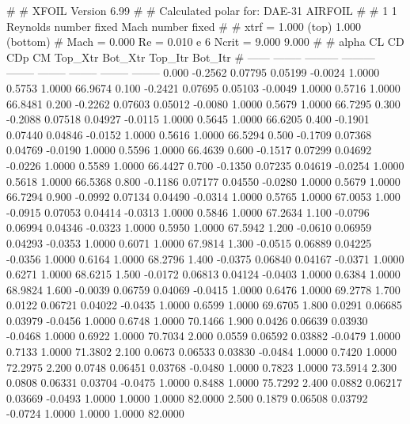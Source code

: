 #  
#       XFOIL         Version 6.99
#  
# Calculated polar for: DAE-31 AIRFOIL                                  
#  
# 1 1 Reynolds number fixed          Mach number fixed         
#  
# xtrf =   1.000 (top)        1.000 (bottom)  
# Mach =   0.000     Re =     0.010 e 6     Ncrit =   9.000  9.000
#  
#   alpha    CL        CD       CDp       CM     Top_Xtr  Bot_Xtr  Top_Itr  Bot_Itr
#  ------ -------- --------- --------- -------- -------- -------- -------- --------
   0.000  -0.2562   0.07795   0.05199  -0.0024   1.0000   0.5753   1.0000  66.9674
   0.100  -0.2421   0.07695   0.05103  -0.0049   1.0000   0.5716   1.0000  66.8481
   0.200  -0.2262   0.07603   0.05012  -0.0080   1.0000   0.5679   1.0000  66.7295
   0.300  -0.2088   0.07518   0.04927  -0.0115   1.0000   0.5645   1.0000  66.6205
   0.400  -0.1901   0.07440   0.04846  -0.0152   1.0000   0.5616   1.0000  66.5294
   0.500  -0.1709   0.07368   0.04769  -0.0190   1.0000   0.5596   1.0000  66.4639
   0.600  -0.1517   0.07299   0.04692  -0.0226   1.0000   0.5589   1.0000  66.4427
   0.700  -0.1350   0.07235   0.04619  -0.0254   1.0000   0.5618   1.0000  66.5368
   0.800  -0.1186   0.07177   0.04550  -0.0280   1.0000   0.5679   1.0000  66.7294
   0.900  -0.0992   0.07134   0.04490  -0.0314   1.0000   0.5765   1.0000  67.0053
   1.000  -0.0915   0.07053   0.04414  -0.0313   1.0000   0.5846   1.0000  67.2634
   1.100  -0.0796   0.06994   0.04346  -0.0323   1.0000   0.5950   1.0000  67.5942
   1.200  -0.0610   0.06959   0.04293  -0.0353   1.0000   0.6071   1.0000  67.9814
   1.300  -0.0515   0.06889   0.04225  -0.0356   1.0000   0.6164   1.0000  68.2796
   1.400  -0.0375   0.06840   0.04167  -0.0371   1.0000   0.6271   1.0000  68.6215
   1.500  -0.0172   0.06813   0.04124  -0.0403   1.0000   0.6384   1.0000  68.9824
   1.600  -0.0039   0.06759   0.04069  -0.0415   1.0000   0.6476   1.0000  69.2778
   1.700   0.0122   0.06721   0.04022  -0.0435   1.0000   0.6599   1.0000  69.6705
   1.800   0.0291   0.06685   0.03979  -0.0456   1.0000   0.6748   1.0000  70.1466
   1.900   0.0426   0.06639   0.03930  -0.0468   1.0000   0.6922   1.0000  70.7034
   2.000   0.0559   0.06592   0.03882  -0.0479   1.0000   0.7133   1.0000  71.3802
   2.100   0.0673   0.06533   0.03830  -0.0484   1.0000   0.7420   1.0000  72.2975
   2.200   0.0748   0.06451   0.03768  -0.0480   1.0000   0.7823   1.0000  73.5914
   2.300   0.0808   0.06331   0.03704  -0.0475   1.0000   0.8488   1.0000  75.7292
   2.400   0.0882   0.06217   0.03669  -0.0493   1.0000   1.0000   1.0000  82.0000
   2.500   0.1879   0.06508   0.03792  -0.0724   1.0000   1.0000   1.0000  82.0000
